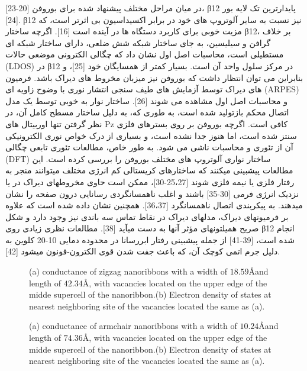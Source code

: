 در میان مراحل مختلف پیشنهاد شده برای بوروفن [20-23]، β12  پایدارترین تک لایه بور [24]. β12 نیز نسبت به سایر آلوتروپ های خود در برابر اکسیداسیون بی اثرتر است، که مزیت خوبی برای کاربرد دستگاه ها در آینده است [16]. اگرچه ساختار β12، بر خلاف گرافن و سیلیسین، به جای ساختار شبکه شش ضلعی، دارای ساختار شبکه ای مستطیلی است، محاسبات اصل اول نشان داد که چگالی الکترونی موضعی حالات (LDOS) در β12 در مرکز سلول واحد آن است. بسیار کمتر از همسایگان خود [25]، و بنابراین می توان انتظار داشت که بوروفن نیز میزبان مخروط های دیراک باشد. فرمیون های دیراک توسط آزمایش های طیف سنجی انتشار نوری با وضوح زاویه ای (ARPES) و محاسبات اصل اول مشاهده می شوند [26]. ساختار نوار به خوبی توسط یک مدل اتصال محکم بازتولید شده است، به طوری که، به دلیل ساختار مسطح کامل آن، در نظر گرفتن تنها اوربیتال های Pz کافی است. اگرچه بوروفن بر روی بسترهای فلزی سنتز شده است، اما هنوز جدا نشده است، و بسیاری از درک خواص نوری الکترونیکی آن از تئوری و محاسبات ناشی می شود. به طور خاص، مطالعات تئوری تابعی چگالی (DFT) ساختار نواری آلوتروپ های مختلف بوروفن را بررسی کرده است. این مطالعات پیشبینی میکنند که ساختارهای کریستالی کم انرژی مختلف میتوانند منجر به رفتار فلزی یا نیمه فلزی شوند [25،27-30]، ممکن است حاوی مخروطهای دیراک در یا نزدیک انرژی فرمی [30-35] باشند و اغلب ناهمسانگردی رسانایی درون صفحه را نشان میدهند. به پیکربندی اتصال ناهمسانگرد [36،37]. همچنین نشان داده شده است که علاوه بر فرمیونهای دیراک، مدلهای دیراک در نقاط تماس سه باندی نیز وجود دارد و شکل صریح همیلتونهای مؤثر آنها به دست میآید [38]. مطالعات نظری زیادی روی β12 انجام شده است، [39-41] از جمله پیشبینی رفتار ابررسانا در محدوده دمایی 10-20 کلوین به دلیل جرم اتمی کوچک آن، که باعث جفت شدن قوی الکترون-فونون میشود [42].

\begin{figure}[ht]
    \centering
    
    \caption{(a) conductance of zigzag nanoribbons with a 
    width of $18.59$\AA and length of $42.34$\AA, with  vacancies located on the upper edge of the midde supercell 
    of the nanoribbon.(b) Electron density of states at nearest neighboring site of the vacancies located the same as (a).}
    \label{armvacancy}
  \end{figure}
  
  \begin{figure}[ht]
    \centering
    
    \caption{(a) conductance of armchair nanoribbons with a 
    width of $10.24$\AA and length of $74.36$\AA, with  vacancies located on the upper edge of the midde supercell 
    of the nanoribbon.(b) Electron density of states at nearest neighboring site of the vacancies located the same as (a).}
    \label{zigvacancy}
  \end{figure}
  


